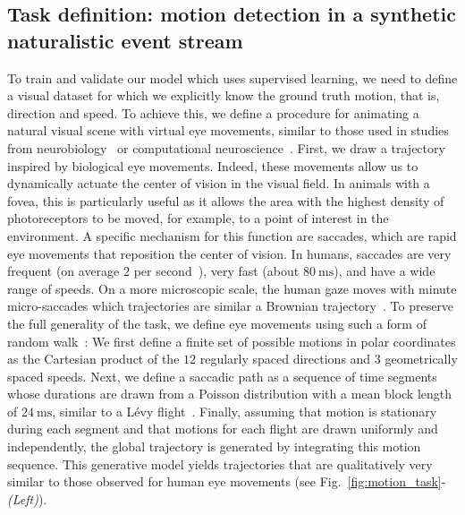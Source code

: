 \documentclass[default]{sn-jnl}%
\theoremstyle{thmstyleone}%
\theoremstyle{thmstyletwo}%
\theoremstyle{thmstylethree}%
\newcommand{\seeFig}[1]{see Fig.~\ref{fig:#1}}%
\newcommand{\ms}{\si{\milli\second}}%
\begin{document}
\subsection{Task definition: motion detection in a synthetic naturalistic event stream}\label{sec:task}
To train and validate our model which uses supervised learning, we need to define a visual dataset for which we explicitly know the ground truth motion, that is, direction and speed. To achieve this, we define a procedure for animating a natural visual scene with virtual eye movements, similar to those used in  studies from neurobiology~\citep{vinje_sparse_2000, baudot_animation_2013} or computational neuroscience~\citep{kremkow_push-pull_2016}. First, we draw a trajectory inspired by biological eye movements. Indeed, these movements allow us to dynamically actuate the center of vision in the visual field. In animals with a fovea, this is particularly useful as it allows the area with the highest density of photoreceptors to be moved, for example, to a point of interest in the environment. A specific mechanism for this function are saccades, which are rapid eye movements that reposition the center of vision. In humans, saccades are very frequent (on average $2$ per second~\citep{dandekar_neural_2012}), very fast (about $80~\ms$), and have a wide range of speeds. On a more microscopic scale, the human gaze moves with minute micro-saccades which trajectories are similar a Brownian trajectory~\citep{poletti_head-eye_2015}. To preserve the full generality of the task, we define eye movements using such a form of random walk~\citep{engbert_integrated_2011}: We first define a finite set of possible motions in polar coordinates as the Cartesian product of the $12$ regularly spaced directions and $3$ geometrically spaced speeds. Next, we define a saccadic path as a sequence of time segments whose durations are drawn from a Poisson distribution with a mean block length of $24~\ms$, similar to a Lévy flight~\citep[p. 289]{mandelbrot_fractal_1982}. Finally, assuming that  motion is stationary during each segment and that motions for each flight are drawn uniformly and independently, the global trajectory is generated by integrating this motion sequence. This generative model yields trajectories that are qualitatively very similar to those observed for human eye movements (\seeFig{motion_task}-\textit{(Left)}).
\end{document}
